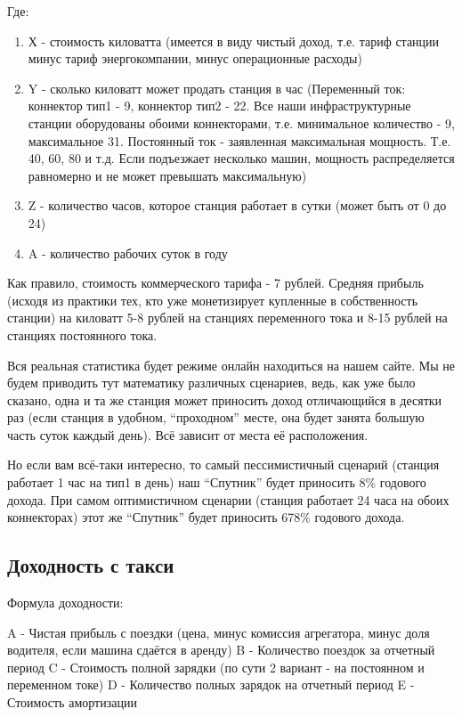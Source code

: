 \documentclass[a4paper,12pt]{report}
\begin{document}
Где:
\begin{enumerate}

	\item Х - стоимость киловатта (имеется в виду чистый доход, т.е. тариф станции минус тариф энергокомпании, минус операционные расходы)

	\item Y - сколько киловатт может продать станция в час (Переменный ток: коннектор тип1 - 9, коннектор тип2 - 22. Все наши инфраструктурные станции оборудованы обоими коннекторами, т.е. минимальное количество - 9, максимальное 31. Постоянный ток - заявленная максимальная мощность. Т.е. 40, 60, 80 и т.д. Если подъезжает несколько машин, мощность распределяется равномерно и не может превышать максимальную)

	\item Z - количество часов, которое станция работает в сутки (может быть от 0 до 24)
	\item A - количество рабочих суток в году 
\end{enumerate}

Как правило, стоимость коммерческого тарифа - 7 рублей. Средняя прибыль (исходя из практики тех, кто уже монетизирует купленные в собственность станции) на киловатт 5-8 рублей на станциях переменного тока и 8-15 рублей на станциях постоянного тока. 

Вся реальная статистика будет режиме онлайн находиться на нашем сайте. Мы не будем приводить тут математику различных сценариев, ведь, как уже было сказано, одна и та же станция может приносить доход отличающийся в десятки раз (если станция в удобном, “проходном” месте, она будет занята большую часть суток каждый день). Всё зависит от места её расположения.

Но если вам всё-таки интересно, то самый пессимистичный сценарий (станция работает 1 час на тип1 в день) наш “Спутник” будет приносить 8\% годового дохода. При самом оптимистичном сценарии (станция работает 24 часа на обоих коннекторах) этот же “Спутник” будет приносить 678\% годового дохода.


\subsection{Доходность с такси}

Формула доходности:

A - Чистая прибыль с поездки (цена, минус комиссия агрегатора, минус доля водителя, если машина сдаётся в аренду)
B - Количество поездок за отчетный период
C - Стоимость полной зарядки (по сути 2 вариант - на постоянном и переменном токе)
D - Количество полных зарядок на отчетный период
E - Стоимость амортизации
\end{document}
